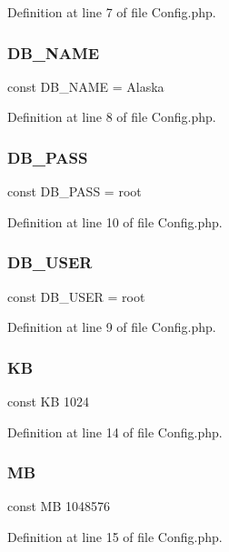 Definition at line 7 of file Config.\+php.

\mbox{\label{_config_8php_ab5db0d3504f917f268614c50b02c53e2}} 
\subsubsection{D\+B\+\_\+\+N\+A\+ME}
{\footnotesize\ttfamily const D\+B\+\_\+\+N\+A\+ME = \textquotesingle{}Alaska\textquotesingle{}}



Definition at line 8 of file Config.\+php.

\mbox{\label{_config_8php_a8bb9c4546d91667cfa61879d83127a92}} 
\subsubsection{D\+B\+\_\+\+P\+A\+SS}
{\footnotesize\ttfamily const D\+B\+\_\+\+P\+A\+SS = \textquotesingle{}root\textquotesingle{}}



Definition at line 10 of file Config.\+php.

\mbox{\label{_config_8php_a1d1d99f8e08f387d84fe9848f3357156}} 
\subsubsection{D\+B\+\_\+\+U\+S\+ER}
{\footnotesize\ttfamily const D\+B\+\_\+\+U\+S\+ER = \textquotesingle{}root\textquotesingle{}}



Definition at line 9 of file Config.\+php.

\mbox{\label{_config_8php_a4f06cdd0c63f3ce691804d6c90ea6c32}} 
\subsubsection{KB}
{\footnotesize\ttfamily const KB 1024}



Definition at line 14 of file Config.\+php.

\mbox{\label{_config_8php_a91c734126e699a6ba53fe57e06bb8b49}} 
\subsubsection{MB}
{\footnotesize\ttfamily const MB 1048576}



Definition at line 15 of file Config.\+php.

